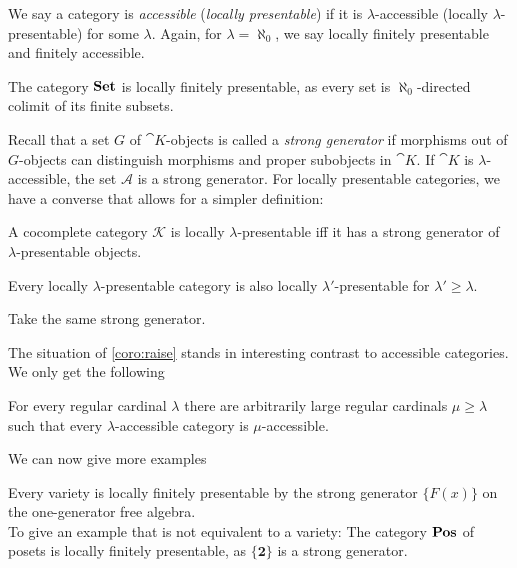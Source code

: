 We say a category is \emph{accessible} (\emph{locally presentable}) if it is $\lambda$-accessible (locally $\lambda$-presentable) for some $\lambda$. Again, for $\lambda = \aleph_0$, we say locally finitely presentable and finitely accessible. \\

\begin{Example}
The category $\mathbf{Set}$ is locally finitely presentable, as every set is $\aleph_0$-directed colimit of its finite subsets.
\end{Example}

Recall that a set $G$ of $\cat K$-objects is called a \emph{strong generator} if morphisms out of $G$-objects can distinguish morphisms and proper subobjects in $\cat K$. If $\cat K$ is $\lambda$-accessible, the set $\mathcal A$ is a strong generator. For locally presentable categories, we have a converse that allows for a simpler definition:

\begin{Proposition}
A cocomplete category $\mathcal K$ is locally $\lambda$-presentable iff it has a strong generator of $\lambda$-presentable objects. 
\end{Proposition}

\begin{Corollary}\label{coro:raise}
Every locally $\lambda$-presentable category is also locally $\lambda'$-presentable for $\lambda' \geq \lambda$.
\end{Corollary}
\begin{Proof}
Take the same strong generator.
\end{Proof}

The situation of \ref{coro:raise} stands in interesting contrast to accessible categories. We only get the following
\begin{Proposition}
For every regular cardinal $\lambda$ there are arbitrarily large regular cardinals $\mu \geq \lambda$ such that every $\lambda$-accessible category is $\mu$-accessible.
\end{Proposition}

We can now give more examples

\begin{Example}
Every variety is locally finitely presentable by the strong generator $\{ F(x) \}$ on the one-generator free algebra. \\

To give an example that is not equivalent to a variety: The category $\mathbf{Pos}$ of posets is locally finitely presentable, as $\{\mathbf 2\}$ is a strong generator. %
\end{Example}

